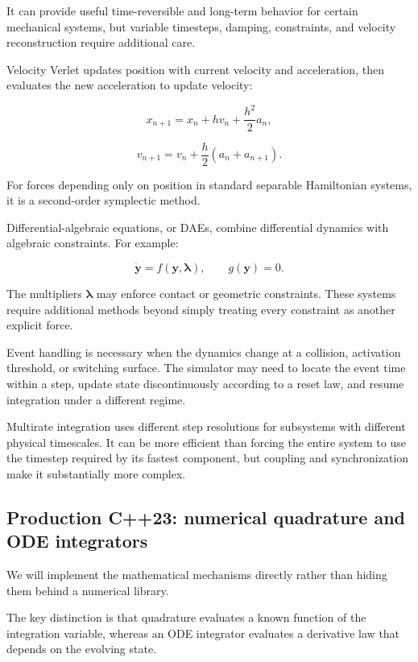 It can provide useful time-reversible and long-term behavior for certain mechanical systems, but variable timesteps, damping, constraints, and velocity reconstruction require additional care.

Velocity Verlet updates position with current velocity and acceleration, then evaluates the new acceleration to update velocity:

\[
x_{n+1}=x_n+hv_n+\frac{h^2}{2}a_n,
\]

\[
v_{n+1}=v_n+\frac h2(a_n+a_{n+1}).
\]

For forces depending only on position in standard separable Hamiltonian systems, it is a second-order symplectic method.

Differential-algebraic equations, or DAEs, combine differential dynamics with algebraic constraints. For example:

\[
\dot{\mathbf y}=f(\mathbf y,\boldsymbol\lambda), \qquad g(\mathbf y)=0.
\]

The multipliers \(\boldsymbol\lambda\) may enforce contact or geometric constraints. These systems require additional methods beyond simply treating every constraint as another explicit force.

Event handling is necessary when the dynamics change at a collision, activation threshold, or switching surface. The simulator may need to locate the event time within a step, update state discontinuously according to a reset law, and resume integration under a different regime.

Multirate integration uses different step resolutions for subsystems with different physical timescales. It can be more efficient than forcing the entire system to use the timestep required by its fastest component, but coupling and synchronization make it substantially more complex.

\subsection{Production C++23: numerical quadrature and ODE integrators}\label{02-foundations-ii-ch025-production-c23-numerical-quadrature-and-ode-integrators}

We will implement the mathematical mechanisms directly rather than hiding them behind a numerical library.

The key distinction is that quadrature evaluates a known function of the integration variable, whereas an ODE integrator evaluates a derivative law that depends on the evolving state.

